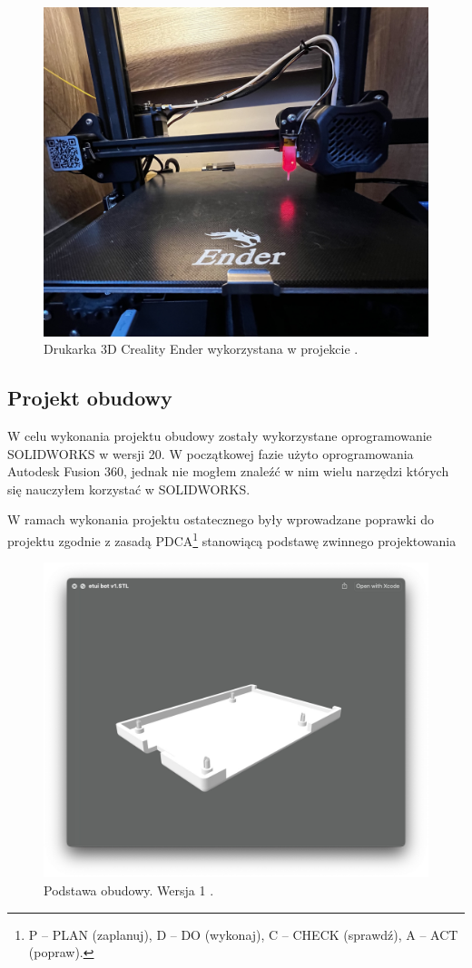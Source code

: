 \documentclass[a4paper,12pt,reqno]{article}
\begin{document}
\begin{figure}[H]%
\centering
\includegraphics[width=0.8\columnwidth]{imgs/ender3v2.jpg}
\caption{Drukarka 3D Creality Ender wykorzystana w projekcie \cite{img_me}. \label{ender3d}}
\quad
\end{figure}

\newpage
\subsection{Projekt obudowy}
W celu wykonania projektu obudowy zostały wykorzystane oprogramowanie SOLIDWORKS w wersji 20.
W początkowej fazie użyto oprogramowania Autodesk Fusion 360, jednak nie mogłem znaleźć w nim wielu narzędzi których się nauczyłem korzystać w SOLIDWORKS.

W ramach wykonania projektu ostatecznego były wprowadzane poprawki do projektu zgodnie z zasadą PDCA\footnote{P – PLAN (zaplanuj), D – DO (wykonaj), C – CHECK (sprawdź), A – ACT (popraw).} stanowiącą podstawę zwinnego projektowania

\begin{figure}[H]%
\centering
\includegraphics[width=0.8\columnwidth]{imgs/etui_bot_v1.jpg}
\caption{Podstawa obudowy. Wersja 1 \cite{img_me}. \label{etui_bot_v1}}
\quad
\end{figure}
\end{document}
